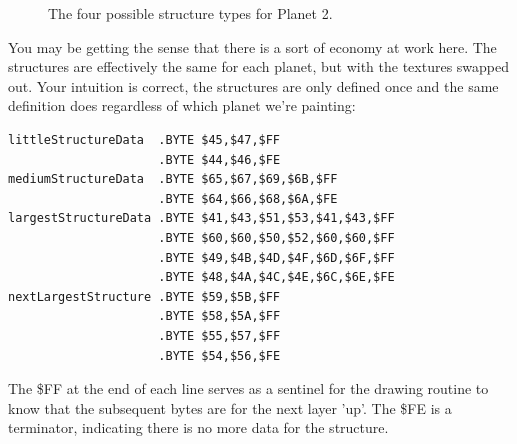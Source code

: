 \begin{figure}[H]
  {
    \setlength{\tabcolsep}{3.0pt}
    \setlength\cmidrulewidth{\heavyrulewidth} %
    \begin{adjustbox}{width=15cm,center}
      \begin{subfigure}{0.3\textwidth}
        
      \end{subfigure}
      \begin{subfigure}{0.3\textwidth}
        
      \end{subfigure}
      \begin{subfigure}{0.3\textwidth}
        
      \end{subfigure}
      \begin{subfigure}{0.3\textwidth}
        
      \end{subfigure}
    \end{adjustbox}
  }\caption[]{The four possible structure types for Planet 2.}
\end{figure}

You may be getting the sense that there is a sort of economy at work here. The structures are effectively
the same for each planet, but with the textures swapped out. Your intuition is correct, the structures
are only defined once and the same definition does regardless of which planet we're painting:

\begin{lstlisting}[caption=The definitions of three of the structures above\, each of which serves all five planets.]
littleStructureData  .BYTE $45,$47,$FF
                     .BYTE $44,$46,$FE
mediumStructureData  .BYTE $65,$67,$69,$6B,$FF
                     .BYTE $64,$66,$68,$6A,$FE
largestStructureData .BYTE $41,$43,$51,$53,$41,$43,$FF
                     .BYTE $60,$60,$50,$52,$60,$60,$FF
                     .BYTE $49,$4B,$4D,$4F,$6D,$6F,$FF
                     .BYTE $48,$4A,$4C,$4E,$6C,$6E,$FE
nextLargestStructure .BYTE $59,$5B,$FF
                     .BYTE $58,$5A,$FF
                     .BYTE $55,$57,$FF
                     .BYTE $54,$56,$FE
\end{lstlisting}

The \$FF at the end of each line serves as a sentinel for the drawing routine to know that the subsequent bytes
are for the next layer 'up'. The \$FE is a terminator, indicating there is no more data for the structure.

